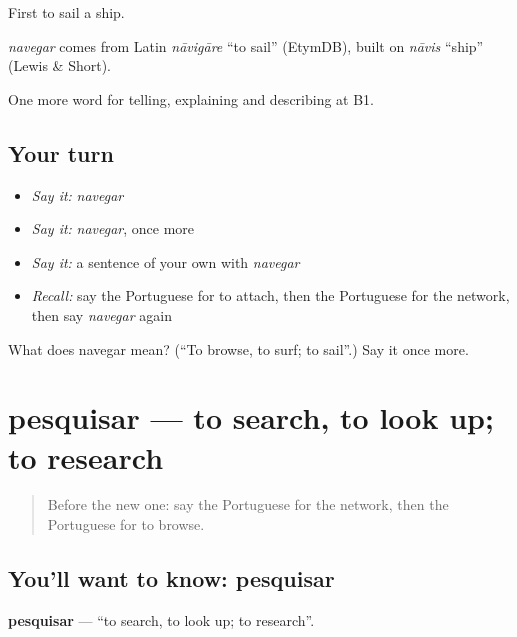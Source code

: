 First to sail a ship.

\begin{cousinweb}
\emph{navegar} comes from Latin \emph{nāvigāre} \textquotedblleft{}to sail\textquotedblright{} (EtymDB), built on \emph{nāvis} \textquotedblleft{}ship\textquotedblright{} (Lewis \& Short).
\end{cousinweb}

\begin{grammarlens}[title={What you've built}]
One more word for telling, explaining and describing at B1.
\end{grammarlens}

\subsection*{Your turn}
\begin{itemize}
\raggedright
  \item \emph{Say it:} \emph{navegar}
  \item \emph{Say it:} \emph{navegar}, once more
  \item \emph{Say it:} a sentence of your own with \emph{navegar}
  \item \emph{Recall:} say the Portuguese for to attach, then the Portuguese for the network, then say \emph{navegar} again
\end{itemize}

\begin{tcolorbox}[breakable,colback=teal!4,colframe=teal!35!black,title={Before you move on}]
What does navegar mean? (\textquotedblleft{}To browse, to surf; to sail\textquotedblright{}.) Say it once more.
\end{tcolorbox}
\section[pesquisar]{pesquisar — to search, to look up; to research}

\label{lesson:PT-C399-pesquisar}



\begin{quote}
Before the new one: say the Portuguese for the network, then the Portuguese for to browse.
\end{quote}

\subsection*{You'll want to know: pesquisar}
\textbf{pesquisar} — \textquotedblleft{}to search, to look up; to research\textquotedblright{}.

